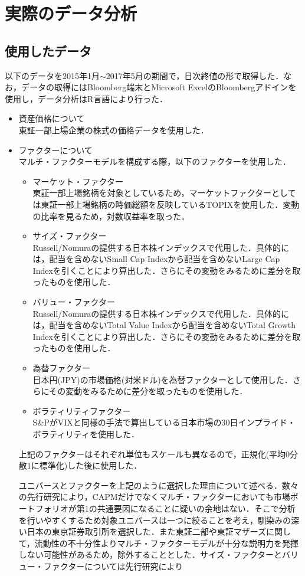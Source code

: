 \documentclass[11pt]{jreport}
\begin{document}
\chapter{実際のデータ分析}
\section{使用したデータ}
以下のデータを2015年1月$\sim$2017年5月の期間で，日次終値の形で取得した．なお，データの取得にはBloomberg端末とMicrosoft ExcelのBloombergアドインを使用し，データ分析はR言語により行った．
\begin{itemize}
\item 資産価格について\\
東証一部上場企業の株式の価格データを使用した．
\item ファクターについて\\
マルチ・ファクターモデルを構成する際，以下のファクターを使用した．
\begin{itemize}
\item マーケット・ファクター\\
東証一部上場銘柄を対象としているため，マーケットファクターとしては東証一部上場銘柄の時価総額を反映しているTOPIXを使用した．変動の比率を見るため，対数収益率を取った．
\item サイズ・ファクター\\
Russell/Nomuraの提供する日本株インデックスで代用した．具体的には，配当を含めないSmall Cap Indexから配当を含めないLarge Cap Indexを引くことにより算出した．さらにその変動をみるために差分を取ったものを使用した．
\item バリュー・ファクター\\
Russell/Nomuraの提供する日本株インデックスで代用した．具体的には，配当を含めないTotal Value Indexから配当を含めないTotal Growth Indexを引くことにより算出した．さらにその変動をみるために差分を取ったものを使用した．
\item 為替ファクター\\
日本円(JPY)の市場価格(対米ドル)を為替ファクターとして使用した．さらにその変動をみるために差分を取ったものを使用した．
\item ボラティリティファクター\\
S\&PがVIXと同様の手法で算出している日本市場の30日インプライド・ボラティリティを使用した．
\end{itemize}
上記のファクターはそれぞれ単位もスケールも異なるので，正規化(平均0分散1に標準化)した後に使用した．

ユニバースとファクターを上記のように選択した理由について述べる．数々の先行研究により，CAPMだけでなくマルチ・ファクターにおいても市場ポートフォリオが第1の共通要因になることに疑いの余地はない．そこで分析を行いやすくするため対象ユニバースは一つに絞ることを考え，馴染みの深い日本の東京証券取引所を選択した．また東証二部や東証マザーズに関して，流動性の不十分性よりマルチ・ファクターモデルが十分な説明力を発揮しない可能性があるため，除外することとした．サイズ・ファクターとバリュー・ファクターについては先行研究により
\end{itemize}
\end{document}
